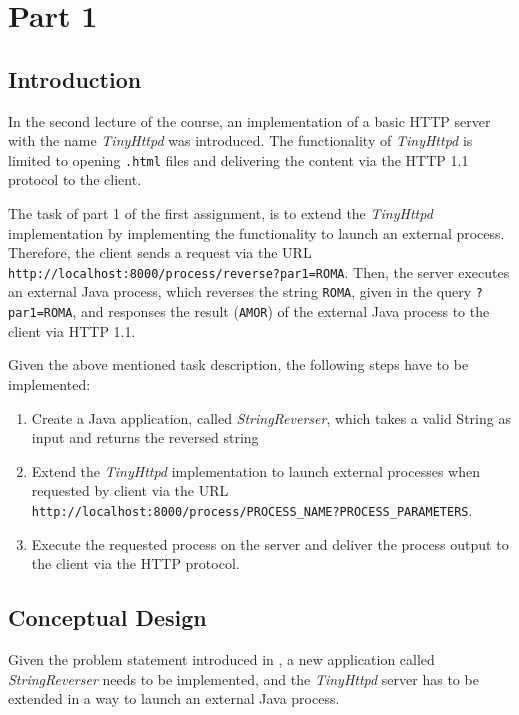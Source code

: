 \section{Part 1}\label{sec:01_part1}

\subsection{Introduction}\label{subsec:01_part1_intro}
In the second lecture of the course, an implementation of a basic HTTP server with the name \textit{TinyHttpd} was introduced.
The functionality of \textit{TinyHttpd} is limited to opening \texttt{.html} files and delivering the content via the HTTP 1.1 protocol to the client.


The task of part 1 of the first assignment, is to extend the \textit{TinyHttpd} implementation by implementing the functionality to launch an external process. Therefore, the client sends a request via the URL \texttt{http://localhost:8000/process/reverse?par1=ROMA}. Then, the server executes an external Java process, which reverses the string \texttt{ROMA}, given in the query \texttt{?par1=ROMA}, and responses the result (\texttt{AMOR}) of the external Java process to the client via HTTP 1.1.


Given the above mentioned task description, the following steps have to be implemented:
\begin{enumerate}
\item Create a Java application, called \textit{StringReverser}, which takes a valid String as input and returns the reversed string
\item Extend the \textit{TinyHttpd} implementation to launch external processes when requested by client via the URL \texttt{http://localhost:8000/process/PROCESS\_NAME?PROCESS\_PARAMETERS}.
\item Execute the requested process on the server and deliver the process output to the client via the HTTP protocol.
\end{enumerate}

\subsection{Conceptual Design}\label{subsec:01_part1_design}
Given the problem statement introduced in , a new application called \textit{StringReverser} needs to be implemented, and the \textit{TinyHttpd} server has to be extended in a way to launch an external Java process.

